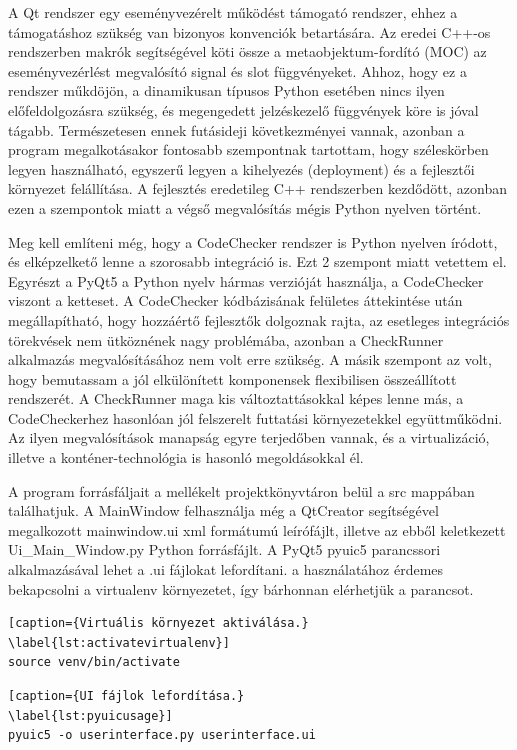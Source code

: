 \documentclass[a4paper,12pt]{report}
\begin{document}
A Qt rendszer egy eseményvezérelt működést támogató rendszer, ehhez a támogatáshoz szükség van bizonyos konvenciók betartására. Az eredei C++-os rendszerben makrók segítségével köti össze a metaobjektum-fordító (MOC) az eseményvezérlést megvalósító signal és slot függvényeket. Ahhoz, hogy ez a rendszer műkdöjön, a dinamikusan típusos Python esetében nincs ilyen előfeldolgozásra szükség, és megengedett jelzéskezelő függvények köre is jóval tágabb. Természetesen ennek futásideji következményei vannak, azonban a  program megalkotásakor fontosabb szempontnak tartottam, hogy széleskörben legyen használható, egyszerű legyen a kihelyezés (deployment) és a fejlesztői környezet felállítása. A fejlesztés eredetileg C++ rendszerben kezdődött, azonban ezen a szempontok miatt a végső megvalósítás mégis Python nyelven történt.

Meg kell említeni még, hogy a CodeChecker rendszer is Python nyelven íródott, és elképzelkető lenne a szorosabb integráció is. Ezt 2 szempont miatt vetettem el. Egyrészt a PyQt5 a Python nyelv hármas verzióját használja, a CodeChecker viszont a ketteset. A CodeChecker kódbázisának felületes áttekintése után megállapítható, hogy hozzáértő fejlesztők dolgoznak rajta, az esetleges integrációs törekvések nem ütköznének nagy problémába, azonban a CheckRunner alkalmazás megvalósításához nem volt erre szükség. A másik szempont az volt, hogy bemutassam a jól elkülönített komponensek flexibilisen összeállított rendszerét. A CheckRunner maga kis változtattásokkal képes lenne más, a CodeCheckerhez hasonlóan jól felszerelt futtatási környezetekkel együttműködni. Az ilyen megvalósítások manapság egyre terjedőben vannak, és a virtualizáció, illetve a konténer-technológia is hasonló megoldásokkal él.

A program forrásfáljait a mellékelt projektkönyvtáron belül a src mappában találhatjuk. A MainWindow felhasználja még a QtCreator segítségével megalkozott mainwindow.ui xml formátumú leírófájlt, illetve az ebből keletkezett Ui\_Main\_Window.py Python forrásfájlt. A PyQt5 pyuic5 parancssori alkalmazásával lehet a .ui fájlokat lefordítani. a használatához érdemes bekapcsolni a virtualenv környezetet, így bárhonnan elérhetjük a parancsot.

\begin{lstlisting}[caption={Virtuális környezet aktiválása.}
\label{lst:activatevirtualenv}]
source venv/bin/activate
\end{lstlisting}

\begin{lstlisting}[caption={UI fájlok lefordítása.}
\label{lst:pyuicusage}]
pyuic5 -o userinterface.py userinterface.ui
\end{lstlisting}
\end{document}
